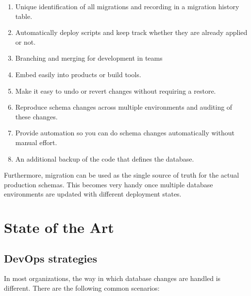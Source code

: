 \begin{enumerate}
	\item Unique identification of all migrations and recording in a migration history table.
    \item Automatically deploy scripts and keep track whether they are already applied or not.
    \item Branching and merging for development in teams
    \item Embed easily into products or build tools.
    \item Make it easy to undo or revert changes without requiring a restore.
    \item Reproduce schema changes across multiple environments and auditing of these changes.
    \item Provide automation so you can do schema changes automatically without manual effort.
    \item An additional backup of the code that defines the database.
\end{enumerate}


Furthermore, migration can be used as the single source of truth for the actual production schemas. This becomes very handy once multiple database environments are updated with different deployment states.



\section{State of the Art}%
\subsection{DevOps strategies}
%
In most organizations, the way in which database changes are handled is different. There are the following common scenarios:

